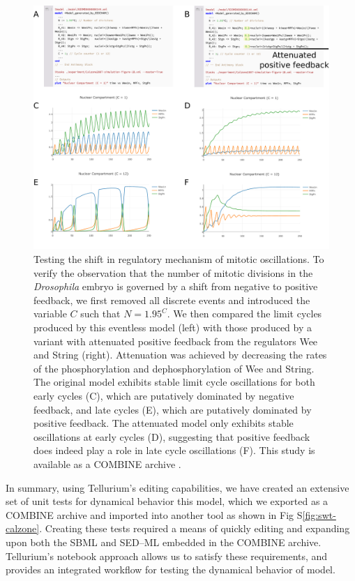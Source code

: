 \documentclass[10pt,letterpaper]{article}
\begin{document}
\begin{figure}
  \includegraphics[width=1.0\textwidth]{calzone-limit-cycles.pdf}
  \caption{Testing the shift in regulatory mechanism of mitotic oscillations. To verify the observation \cite{calzone2007dynamical} that the number of mitotic divisions in the \textit{Drosophila} embryo is governed by a shift from negative to positive feedback, we first removed all discrete events and introduced the variable $C$ such that $N=1.95^C$. We then compared the limit cycles produced by this eventless model (left) with those produced by a variant with attenuated positive feedback from the regulators Wee and String (right). Attenuation was achieved by decreasing the rates of the phosphorylation and dephosphorylation of Wee and String. The original model exhibits stable limit cycle oscillations for both early cycles (C), which are putatively dominated by negative feedback, and late cycles (E), which are putatively dominated by positive feedback. The attenuated model only exhibits stable oscillations at early cycles (D), suggesting that positive feedback does indeed play a role in late cycle oscillations (F). This study is available as a COMBINE archive \cite{calzone-feedback-archive}. }
  \label{fig:calzone-limit-cycles}
\end{figure}

In summary, using Tellurium's editing capabilities, we have created an extensive set of unit tests for dynamical behavior this model, which we exported as a COMBINE archive and imported into another tool as shown in Fig S\ref{fig:swt-calzone}. Creating these tests required a means of quickly editing and expanding upon both the SBML and SED--ML embedded in the COMBINE archive. Tellurium's notebook approach allows us to satisfy these requirements, and provides an integrated workflow for testing the dynamical behavior of model.
\end{document}
